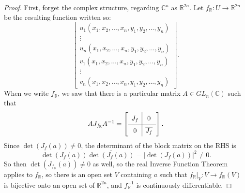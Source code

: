 \documentclass[12pt]{article}
\newcommand{\cx}{\mathbb{C}}
\newcommand{\real}{\mathbb{R}}
\newcommand\inv[1]{#1^{-1}}
\newcommand{\paren}[1]{\left( #1 \right)}
\theoremstyle{definition}
\theoremstyle{remark}
\begin{document}
\begin{proof}
    First, forget the complex structure, regarding $\cx^n$ as $\real^{2n}$. Let $f_{\real} : U \to \real^{2n}$ be the resulting function written so:
    \[
        \begin{bmatrix}
            u_1 \paren{ x_1 , x_2 , \dotsc , x_n , y_1 , y_2 , \dotsc , y_n } \\
            \vdots \\
            u_n \paren{ x_1 , x_2 , \dotsc , x_n , y_1 , y_2 , \dotsc , y_n } \\
            v_1 \paren{ x_1 , x_2 , \dotsc , x_n , y_1 , y_2 , \dotsc , y_n } \\
            \vdots \\
            v_n \paren{ x_1 , x_2 , \dotsc , x_n , y_1 , y_2 , \dotsc , y_n }
        \end{bmatrix}.
    \]
    When we write $f_{\real}$, we saw that there is a particular matrix $A \in GL_n(\cx)$ such that 
    \[
        A J_{f_{\real}} \inv{A} = 
        \left[ 
            \def\arraystretch{1.5}
            \begin{array}{c|c}
                J_f & 0 \\
                \hline
                0 & \overline{J_f}
            \end{array}
        \right].
    \]
    Since $\det \paren{ J_f(a) } \neq 0$, the determinant of the block matrix on the RHS is 
    \[
        \det \paren{ J_f(a) } \overline{ \det \paren{ J_f(a) } } = \left| \det \paren{ J_f(a) } \right|^2 \neq 0.
    \]
    So then $\det \paren{ J_{f_{\real}}(a) } \neq 0$ as well, so the real Inverse Function Theorem applies to $f_{\real}$, so there is an open set $V$ containing $a$ such that $f_{\real} |_V : V \to f_{\real}(V)$ is bijective onto an open set of $\real^{2n}$, and $\inv{f_{\real}}$ is continuously differentiable. 
    

\end{proof}
\end{document}
